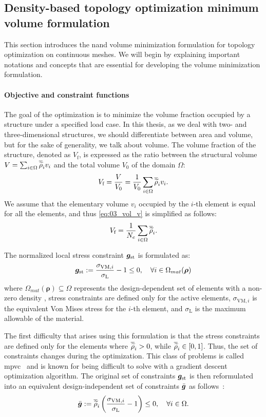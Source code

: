 \subsection{Density-based topology optimization minimum volume formulation}
This section introduces the \gls{nand} volume minimization formulation for topology optimization on continuous meshes. We will begin by explaining important notations and concepts that are essential for developing the volume minimization formulation.
\paragraph{Objective and constraint functions}
The goal of the optimization is to minimize the volume fraction occupied by a structure under a specified load case. In this thesis, as we deal with two- and three-dimensional structures, we should differentiate between area and volume, but for the sake of generality, we talk about volume. The volume fraction of the structure, denoted as $V_\text{f}$, is expressed as the ratio between the structural volume $V=\sum_{i \in \Omega} \overline{\widetilde{\rho}}_i v_i$ and the total volume $V_0$ of the domain $\Omega$:
\begin{equation}
    V_\text{f} = \frac{V}{V_0} = \frac{1}{V_0}\sum_{i \in \Omega} \overline{\widetilde{\rho}}_i v_i.
    \label{eq:03_vol_v}
\end{equation}
We assume that the elementary volume $v_i$ occupied by the $i$-th element is equal for all the elements, and thus \eqref{eq:03_vol_v} is simplified as follows:
\begin{equation}
    V_\text{f} = \frac{1}{N_{e}} \sum_{i \in \Omega} \overline{\widetilde{\rho}}_i. 
    \label{eq:03_obj_vol}  
\end{equation}

The normalized local stress constraint $\bm{g}_{\text{st}}$ is formulated as:
\begin{equation}
    \bm{g}_{\text{st}}:=\frac{\sigma_{\text{VM},i}}{\sigma_\text{L}}-1 \leq 0, \quad \forall i \in \Omega_{mat}(\bm{\rho})
\end{equation}
where $\Omega_{mat}(\bm{\rho}) \subseteq \Omega$ represents the design-dependent set of elements with a non-zero density \ie, stress constraints are defined only for the active elements, $\sigma_{\text{VM},i}$ is the equivalent Von Mises stress for the $i$-th element, and $\sigma_\text{L}$ is the maximum allowable of the material.

The first difficulty that arises using this formulation is that the stress constraints are defined only for the elements where $\overline{\widetilde{\rho}}_i > 0$, while $\overline{\widetilde{\rho}}_i\in[0,1]$. Thus, the set of constraints changes during the optimization. This class of problems is called \acrfull{mpvc}~ and is known for being difficult to solve with a gradient descent optimization algorithm. The original set of constraints $\bm{g}_{\text{st}}$ is then reformulated into an equivalent design-independent set of constraints $\bar{\bm{g}}$ as follows~:
\begin{equation}
    \bar{\bm{g}}:=\overline{\widetilde{\rho}}_i\left(\frac{ \sigma_{\text{VM},i}}{\sigma_\text{L}}-1 \right) \leq 0, \quad \forall i \in \Omega.
\end{equation}
